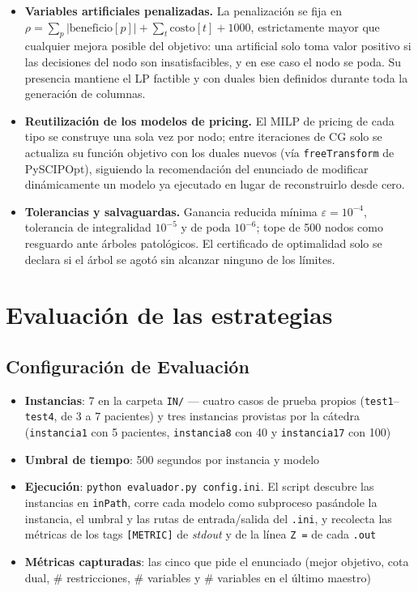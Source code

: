 \documentclass[12pt]{article}
\numberwithin{algorithm}{section}
\begin{document}
\begin{itemize}
    \item \textbf{Variables artificiales penalizadas.} La penalización se fija en $\rho = \sum_p |\text{beneficio}[p]| + \sum_t \text{costo}[t] + 1000$, estrictamente mayor que cualquier mejora posible del objetivo: una artificial solo toma valor positivo si las decisiones del nodo son insatisfacibles, y en ese caso el nodo se poda. Su presencia mantiene el LP factible y con duales bien definidos durante toda la generación de columnas.
    \item \textbf{Reutilización de los modelos de pricing.} El MILP de pricing de cada tipo se construye una sola vez por nodo; entre iteraciones de CG solo se actualiza su función objetivo con los duales nuevos (vía \texttt{freeTransform} de PySCIPOpt), siguiendo la recomendación del enunciado de modificar dinámicamente un modelo ya ejecutado en lugar de reconstruirlo desde cero.
    \item \textbf{Tolerancias y salvaguardas.} Ganancia reducida mínima $\varepsilon = 10^{-4}$, tolerancia de integralidad $10^{-5}$ y de poda $10^{-6}$; tope de 500 nodos como resguardo ante árboles patológicos. El certificado de optimalidad solo se declara si el árbol se agotó sin alcanzar ninguno de los límites.
\end{itemize}

\section{Evaluación de las estrategias}
\label{sec:evaluacion}

\subsection{Configuración de Evaluación}

\begin{itemize}
    \item \textbf{Instancias}: 7 en la carpeta \texttt{IN/} --- cuatro casos de prueba
    propios (\texttt{test1}--\texttt{test4}, de 3 a 7 pacientes) y tres instancias
    provistas por la cátedra (\texttt{instancia1} con 5 pacientes,
    \texttt{instancia8} con 40 y \texttt{instancia17} con 100)
    \item \textbf{Umbral de tiempo}: 500 segundos por instancia y modelo
    \item \textbf{Ejecución}: \texttt{python evaluador.py config.ini}. El script
    descubre las instancias en \texttt{inPath}, corre cada modelo como subproceso
    pasándole la instancia, el umbral y las rutas de entrada/salida del \texttt{.ini},
    y recolecta las métricas de los tags \texttt{[METRIC]} de \emph{stdout} y de la
    línea \texttt{Z =} de cada \texttt{.out}
    \item \textbf{Métricas capturadas}: las cinco que pide el enunciado (mejor
    objetivo, cota dual, \# restricciones, \# variables y \# variables en el último
    maestro)
\end{itemize}
\end{document}
